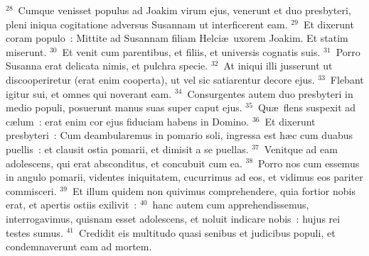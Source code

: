${}^{28}$~Cumque venisset populus ad Joakim virum ejus, venerunt et duo presbyteri, pleni iniqua cogitatione adversus Susannam ut interficerent eam.
${}^{29}$~Et dixerunt coram populo~: Mittite ad Susannam filiam Helci\ae\ uxorem Joakim. Et statim miserunt.
${}^{30}$~Et venit cum parentibus, et filiis, et universis cognatis suis.
${}^{31}$~Porro Susanna erat delicata nimis, et pulchra specie.
${}^{32}$~At iniqui illi jusserunt ut discooperiretur (erat enim cooperta), ut vel sic satiarentur decore ejus.
${}^{33}$~Flebant igitur sui, et omnes qui noverant eam.
${}^{34}$~Consurgentes autem duo presbyteri in medio populi, posuerunt manus suas super caput ejus.
${}^{35}$~Qu\ae\ flens suspexit ad c\ae lum~: erat enim cor ejus fiduciam habens in Domino.
${}^{36}$~Et dixerunt presbyteri~: Cum deambularemus in pomario soli, ingressa est h\ae c cum duabus puellis~: et clausit ostia pomarii, et dimisit a se puellas.
${}^{37}$~Venitque ad eam adolescens, qui erat absconditus, et concubuit cum ea.
${}^{38}$~Porro nos cum essemus in angulo pomarii, videntes iniquitatem, cucurrimus ad eos, et vidimus eos pariter commisceri.
${}^{39}$~Et illum quidem non quivimus comprehendere, quia fortior nobis erat, et apertis ostiis exilivit~:
${}^{40}$~hanc autem cum apprehendissemus, interrogavimus, quisnam esset adolescens, et noluit indicare nobis~: hujus rei testes sumus.
${}^{41}$~Credidit eis multitudo quasi senibus et judicibus populi, et condemnaverunt eam ad mortem.


